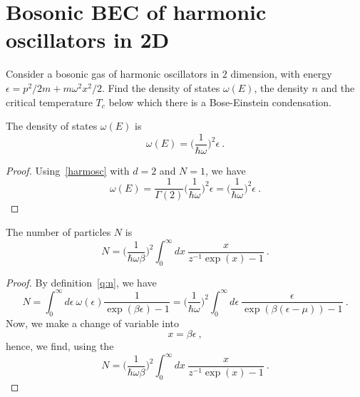 \section{Bosonic BEC of harmonic oscillators in 2D}

    \begin{exercise}
        Consider a bosonic gas of harmonic oscillators in $2$ dimension, with energy $\epsilon = p^2 / 2m + m \omega^2 x^2 / 2$.
        Find the density of states $\omega(E)$, the density $n$ and the critical temperature $T_c$ below which there is a Bose-Einstein condensation.
    \end{exercise}

    The density of states $\omega(E)$ is 
    \begin{equation*}
        \omega(E) = \Big (\frac{1}{\hbar \omega} \Big )^{2} \epsilon ~.
    \end{equation*}
    \begin{proof}
        Using~\eqref{harmosc} with $d = 2$ and $N = 1$, we have
        \begin{equation}
            \omega(E) = \frac{1}{\Gamma (2)} \Big (\frac{1}{\hbar \omega} \Big )^{2} \epsilon = \Big (\frac{1}{\hbar \omega} \Big )^{2} \epsilon ~.
        \end{equation}
    \end{proof}

    The number of particles $N$ is 
    \begin{equation*}
        N = \Big (\frac{1}{\hbar \omega \beta} \Big )^{2} \int_0^\infty d x ~ \frac{x}{z^{-1} \exp (x) - 1} ~.
    \end{equation*}
    \begin{proof}
        By definition~\eqref{q:n}, we have 
        \begin{equation}
            N = \int_0^\infty d\epsilon ~ \omega(\epsilon) \frac{1}{\exp(\beta \epsilon) - 1} = \Big (\frac{1}{\hbar \omega} \Big )^{2} \int_0^\infty d\epsilon ~ \frac{\epsilon}{\exp(\beta (\epsilon - \mu)) - 1} ~.
        \end{equation}
        Now, we make a change of variable into 
        \begin{equation}
            x = \beta \epsilon ~, 
        \end{equation}
        hence, we find, using the 
        \begin{equation*}
            N = \Big (\frac{1}{\hbar \omega \beta} \Big )^{2} \int_0^\infty d x ~ \frac{x}{z^{-1} \exp (x) - 1} ~.
        \end{equation*}
    \end{proof}

